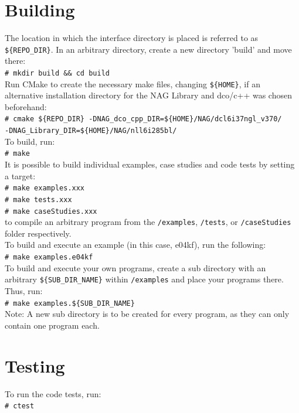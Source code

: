 \documentclass{book}
\begin{document}
\section{Building}
The location in which the interface directory is placed is referred to as \texttt{\$\{REPO\_DIR\}}. In an arbitrary directory, create a new directory ’build’ and move there:\\
\texttt{\# mkdir build \&\& cd build}\\
\newline
Run CMake to create the necessary make files, changing \texttt{\$\{HOME\}}, if an alternative installation directory for the NAG Library and dco/c++ was chosen beforehand:\\
\texttt{\# cmake \$\{REPO\_DIR\} -DNAG\_dco\_cpp\_DIR=\$\{HOME\}/NAG/dcl6i37ngl\_v370/ \\-DNAG\_Library\_DIR=\$\{HOME\}/NAG/nll6i285bl/}\\
\newline
To build, run:\\
\texttt{\# make} \\
\newline
It is possible to build individual examples, case studies and code tests by setting a target:\\
\texttt{\# make examples.xxx\\
\# make tests.xxx\\
\# make caseStudies.xxx}\\
to compile an arbitrary program from the \texttt{/examples}, \texttt{/tests}, or \texttt{/caseStudies} folder respectively.\\
\newline
To build and execute an example (in this case, e04kf), run the following:\\
\texttt{\# make examples.e04kf}\\
\newline
To build and execute your own programs, create a sub directory with an arbitrary \texttt{\$\{SUB\_DIR\_NAME\}} within \texttt{/examples} and place your programs there. Thus, run:\\
\texttt{\# make examples.\$\{SUB\_DIR\_NAME\}}\\
\newline
Note: A new sub directory is to be created for every program, as they can only contain one program each.

\section{Testing}
To run the code tests, run:\\
\texttt{\# ctest}
\end{document}
